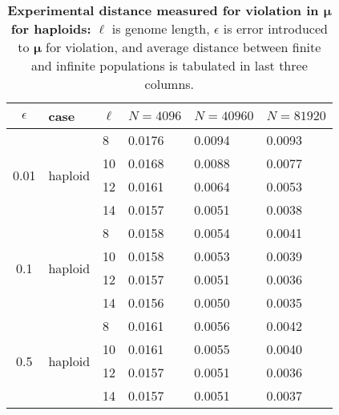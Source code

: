\begin{table}[ht]
\caption{\textbf{Experimental distance measured for violation in $\bm{\mu}$ for haploids:} $\ell$ is genome length, 
$\epsilon$ is error introduced to $\bm{\mu}$ for violation, and average distance between finite and 
infinite populations is tabulated in last three columns.}
\centering
\begin{tabularx}{0.75\textwidth}{ c *{5}{X}}
\toprule
$\epsilon$ & case & $\ell$ & $N = 4096$ & $N = 40960$ & $N = 81920$ \\
\midrule
\multirow{4}{*}{0.01} & \multirow{4}{*}{haploid} 	& 8 & 0.0176	& 0.0094	& 0.0093 \\
		      &   				& 10 & 0.0168	& 0.0088 	& 0.0077 \\ 
		      & 			 	& 12 & 0.0161	& 0.0064 	& 0.0053 \\
		      &  	 			& 14 & 0.0157	& 0.0051 	& 0.0038 \\ 
		      \midrule
\multirow{4}{*}{0.1} & \multirow{4}{*}{haploid} 	& 8 & 0.0158	& 0.0054 	& 0.0041 \\
		      &   				& 10 & 0.0158	& 0.0053 	& 0.0039 \\	
		      & 				& 12 & 0.0157	& 0.0051 	& 0.0036 \\	
		      &  	 			& 14 & 0.0156	& 0.0050 	& 0.0035 \\
		      \midrule
\multirow{4}{*}{0.5} & \multirow{4}{*}{haploid} 	& 8 & 0.0161	&  0.0056	& 0.0042 \\
		      &   				& 10 & 0.0161	&  0.0055	& 0.0040 \\
		      & 				& 12 & 0.0157	&  0.0051	& 0.0036 \\
		      &  	 			& 14 & 0.0157	&  0.0051	& 0.0037 \\
\bottomrule
\end{tabularx}
\label{distanceMuHap}
\end{table}

